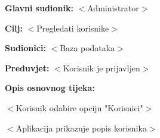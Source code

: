 					\noindent {}
					\begin{packed_item}

						\item \textbf{Glavni sudionik:} $<$Administrator$>$
						\item \textbf{Cilj:} $<$Pregledati korisnike$>$
						\item \textbf{Sudionici:} $<$Baza podataka$>$
						\item \textbf{Preduvjet:} $<$Korisnik je prijavljen$>$
						\item \textbf{Opis osnovnog tijeka:}

						\item[] \begin{packed_enum}

							\item $<$Korisnik odabire opciju "Korisnici"$>$
							\item $<$Aplikacija prikazuje popis korisnika$>$
						\end{packed_enum}
					\end{packed_item}

